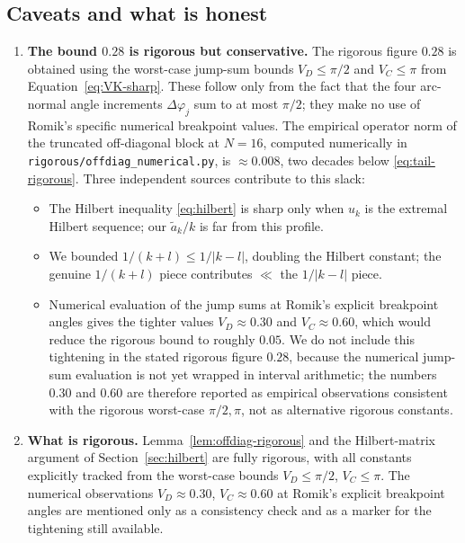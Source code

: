 \subsection{Caveats and what is honest}\label{sec:offdiag-caveats}

\begin{enumerate}
\item \textbf{The bound $0.28$ is rigorous but conservative.}
The rigorous figure $0.28$ is obtained using the worst-case
jump-sum bounds $V_{D} \leq \pi/2$ and $V_{C} \leq \pi$ from
Equation~\eqref{eq:VK-sharp}.  These follow only from the fact
that the four arc-normal angle increments $\Delta\varphi_{j}$ sum
to at most $\pi/2$; they make no use of Romik's specific numerical
breakpoint values.  The empirical operator norm of the truncated
off-diagonal block at $N = 16$, computed numerically in
\texttt{rigorous/offdiag\_numerical.py}, is $\approx 0.008$, two
decades below \eqref{eq:tail-rigorous}.  Three independent
sources contribute to this slack:
   \begin{itemize}
   \item The Hilbert inequality \eqref{eq:hilbert} is sharp only when
   $u_{k}$ is the extremal Hilbert sequence; our $\tilde a_{k}/k$
   is far from this profile.
   \item We bounded $1/(k+l) \leq 1/|k-l|$, doubling the Hilbert
   constant; the genuine $1/(k+l)$ piece contributes $\ll$ the
   $1/|k-l|$ piece.
   \item Numerical evaluation of the jump sums at Romik's explicit
   breakpoint angles gives the tighter values $V_{D} \approx 0.30$
   and $V_{C} \approx 0.60$, which would reduce the rigorous bound
   to roughly $0.05$.  We do not include this tightening in the
   stated rigorous figure $0.28$, because the numerical jump-sum
   evaluation is not yet wrapped in interval arithmetic; the
   numbers $0.30$ and $0.60$ are therefore reported as empirical
   observations consistent with the rigorous worst-case
   $\pi/2, \pi$, not as alternative rigorous constants.
   \end{itemize}

\item \textbf{What is rigorous.}  Lemma~\ref{lem:offdiag-rigorous} and
the Hilbert-matrix argument of Section~\ref{sec:hilbert} are fully
rigorous, with all constants explicitly tracked from the worst-case
bounds $V_{D} \leq \pi/2$, $V_{C} \leq \pi$.  The numerical
observations $V_{D} \approx 0.30$, $V_{C} \approx 0.60$ at Romik's
explicit breakpoint angles are mentioned only as a consistency
check and as a marker for the tightening still available.


\end{enumerate}
